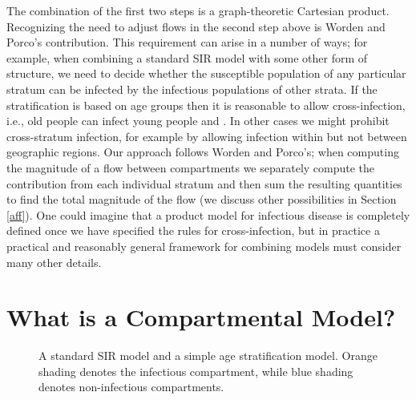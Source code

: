 The combination of the first two steps is a graph-theoretic Cartesian product. Recognizing the need to adjust flows in the second step above is Worden and Porco's contribution. This requirement can arise in a number of ways; for example, when combining a standard SIR model with some other form of structure, we need to decide whether the susceptible population of any particular stratum can be infected by the infectious populations of other strata.
If the stratification is based on age groups then it is reasonable to allow cross-infection, i.e., old people can infect young people and \vv. 
In other cases we might prohibit cross-stratum infection, for example by allowing infection within but not between geographic regions. Our approach follows Worden and Porco's; when computing the magnitude of a flow between compartments we separately compute the contribution from each individual stratum and then sum the resulting quantities to find the total magnitude of the flow (we discuss other possibilities in Section \ref{aff}). One could imagine that a product model for infectious disease is completely defined once we have specified the rules for cross-infection, but in practice a practical and reasonably general framework for combining models must consider many other details.




\section{What is a Compartmental Model?}\label{dcm}

\FloatBarrier
\begin{figure}
    \centering
    
    \caption{A standard SIR model and a simple age stratification model. Orange shading denotes the infectious compartment, while blue shading denotes non-infectious compartments.}
    \label{fig:sir_age_strat}
\end{figure}

